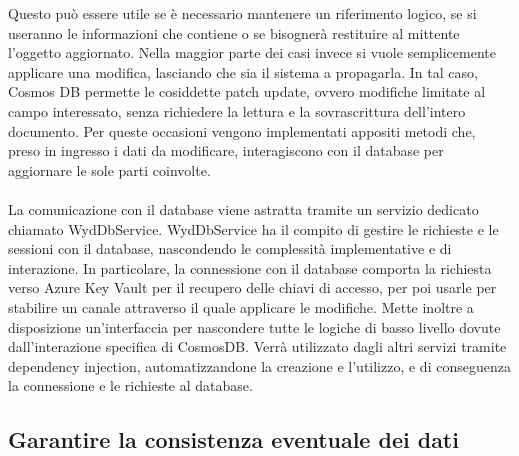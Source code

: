 Questo può essere utile se è necessario mantenere un riferimento logico,
se si useranno le informazioni che contiene
o se bisognerà restituire al mittente l'oggetto aggiornato.
Nella maggior parte dei casi invece si vuole semplicemente applicare una modifica,
lasciando che sia il sistema a propagarla.
In tal caso, Cosmos DB permette le cosiddette patch update,
ovvero modifiche limitate al campo interessato,
senza richiedere la lettura e la sovrascrittura dell'intero documento.
Per queste occasioni vengono implementati appositi metodi che,
preso in ingresso i dati da modificare,
interagiscono con il database per aggiornare le sole parti coinvolte.\\
\\
La comunicazione con il database viene astratta tramite un servizio dedicato chiamato WydDbService.
WydDbService ha il compito di gestire le richieste e le sessioni con il database,
nascondendo le complessità implementative e di interazione.
In particolare, la connessione con il database comporta
la richiesta verso Azure Key Vault per il recupero delle chiavi di accesso,
per poi usarle per stabilire un canale attraverso il quale applicare le modifiche.
Mette inoltre a disposizione un'interfaccia per nascondere
tutte le logiche di basso livello dovute dall'interazione specifica di CosmosDB.
Verrà utilizzato dagli altri servizi tramite dependency injection,
automatizzandone la creazione e l'utilizzo, e di conseguenza la connessione e le richieste al database. \\

\subsection{Garantire la consistenza eventuale dei dati}

